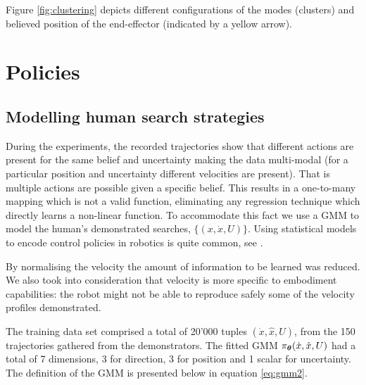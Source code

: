 Figure \ref{fig:clustering} depicts different configurations of the modes (clusters) and believed position of the end-effector (indicated by a yellow arrow).  





\section{Policies}\label{chap3:policies}

\subsection{Modelling human search strategies}\label{chap3:GMM_policy}

During the experiments, the recorded trajectories show that different actions are present for the same belief and uncertainty making the data multi-modal
(for a particular position and uncertainty different velocities are present). That is multiple actions are possible given a specific belief. 
This results in a one-to-many mapping which is not a valid function, eliminating any regression technique which directly learns a non-linear function. 
To accommodate this fact we use a GMM to model the human's demonstrated searches, $\{(x,\dot{x},U)\}$. 
Using statistical models to encode control policies in robotics is quite common, see \cite{BillardCDS08}. 

By normalising the velocity the amount of information to be learned was reduced. We also took into consideration that velocity is more 
specific to embodiment capabilities: the robot might not be able to reproduce safely some of the velocity profiles demonstrated. 

The training data set comprised a total of 20'000 tuples $(\dot{x},\hat{x},U)$, from the 150 trajectories gathered from the demonstrators. 
The fitted GMM $\pi_{\boldsymbol{\theta}}(\dot{x},\hat{x},U)$ had a total of 7 dimensions, 3 for direction, 3 for position and 1 scalar for uncertainty. 
The definition of the GMM is presented below in equation \ref{eq:gmm2}.

